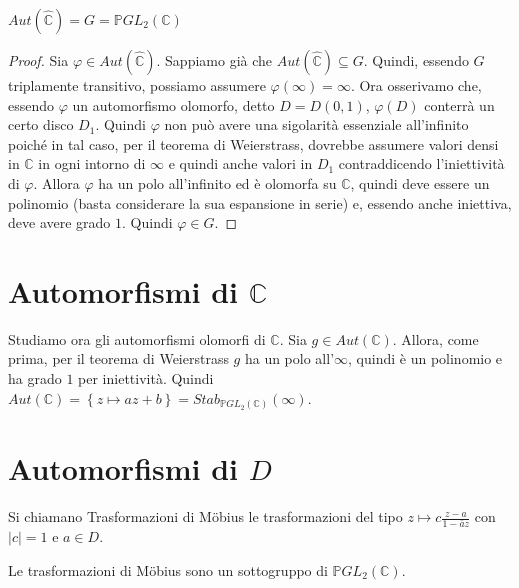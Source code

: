 \begin{proposizione}
$Aut (\hat{\mathbb{C}} ) = G = \mathbb{P}GL_2 (\mathbb{C} )$
\end{proposizione}
\begin{proof}
Sia $\varphi \in Aut (\hat{\mathbb{C}} )$. Sappiamo già che $Aut (\hat{\mathbb{C}} ) \subseteq G$.
Quindi, essendo $G$ triplamente transitivo, possiamo assumere $\varphi( \infty ) = \infty$.
Ora osserivamo che, essendo $\varphi$ un automorfismo olomorfo, detto $D=D(0,1)$, $\varphi (D)$ conterrà
un certo disco $D_1$. Quindi $\varphi$ non può avere una sigolarità essenziale all'infinito poiché in tal caso,
per il teorema di Weierstrass, dovrebbe assumere valori densi in $\mathbb{C}$ in ogni intorno di $\infty$
e quindi anche valori in $D_1$ contraddicendo l'iniettività di $\varphi$.
Allora $\varphi$ ha un polo all'infinito ed è olomorfa su $\mathbb{C}$, quindi deve essere un polinomio (basta considerare la sua espansione in serie) e,
essendo anche iniettiva, deve avere grado $1$. Quindi $\varphi \in G$.
\end{proof}


\section{Automorfismi di $\mathbb{C}$}
Studiamo ora gli automorfismi olomorfi di $\mathbb{C}$.
Sia $g \in Aut(\mathbb{C})$. Allora, come prima, per il teorema di Weierstrass $g$ ha un polo all'$\infty$,
quindi è un polinomio e ha grado $1$ per iniettività. Quindi
$Aut(\mathbb{C} )= \left\{ z\mapsto az+b \right\} = Stab_{\mathbb{P} GL_2 (\mathbb{C})} (\infty )$.


\section{Automorfismi di $D$}
\begin{definizione}
Si chiamano Trasformazioni di Möbius le trasformazioni del tipo $z\mapsto c \displaystyle{\frac{z-a}{1- \bar{a}z}}$ con $|c|=1$ e $a \in D$.
\end{definizione}


\begin{esercizio}
Le trasformazioni di Möbius sono un sottogruppo di $\mathbb{P} GL_2 (\mathbb{C})$.
\end{esercizio}


